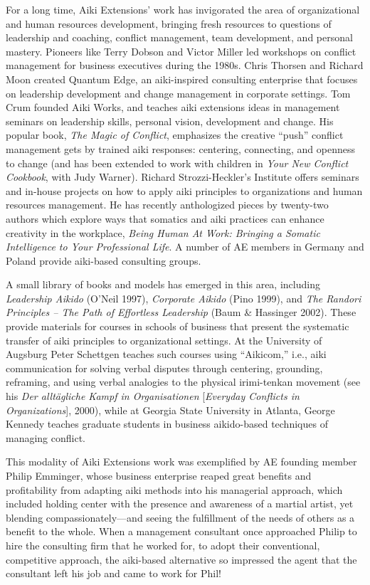 For a long time, Aiki Extensions' work has invigorated the area of organizational and human resources development, bringing fresh resources to questions of leadership and coaching, conflict management, team development, and personal mastery. Pioneers like Terry Dobson and Victor Miller led workshops on conflict management for business executives during the 1980s. Chris Thorsen and Richard Moon created Quantum Edge, an aiki-inspired consulting enterprise that focuses on leadership development and change management in corporate settings. Tom Crum founded Aiki Works, and teaches aiki extensions ideas in management seminars on leadership skills, personal vision, development and change. His popular book, \emph{The Magic of Conflict}, emphasizes the creative ``push'' conflict management gets by trained aiki responses: centering, connecting, and openness to change (and has been extended to work with children in \emph{Your New Conflict Cookbook}, with Judy Warner). Richard Strozzi-Heckler's Institute offers seminars and in-house projects on how to apply aiki principles to organizations and human resources management. He has recently anthologized pieces by twenty-two authors which explore ways that somatics and aiki practices can enhance creativity in the workplace, \emph{Being Human At Work: Bringing a Somatic Intelligence to Your Professional Life}. A number of AE members in Germany and Poland provide aiki-based consulting groups. 

A small library of books and models has emerged in this area, including \emph{Leadership Aikido} (O'Neil 1997), \emph{Corporate Aikido} (Pino 1999), and \emph{The Randori Principles -- The Path of Effortless Leadership} (Baum \& Hassinger 2002). These provide materials for courses in schools of business that present the systematic transfer of aiki principles to organizational settings. At the University of Augsburg Peter Schettgen teaches such courses using ``Aikicom,'' i.e., aiki communication for solving verbal disputes through centering, grounding, reframing, and using verbal analogies to the physical irimi-tenkan movement (see his \emph{Der allt\"{a}gliche Kampf in Organisationen} [\emph{Everyday Conflicts in Organizations}], 2000), while at Georgia State University in Atlanta, George Kennedy teaches graduate students in business aikido-based techniques of managing conflict. 

This modality of Aiki Extensions work was exemplified by AE founding member Philip Emminger, whose business enterprise reaped great benefits and profitability from adapting aiki methods into his managerial approach, which included holding center with the presence and awareness of a martial artist, yet blending compassionately---and seeing the fulfillment of the needs of others as a benefit to the whole. When a management consultant once approached Philip to hire the consulting firm that he worked for, to adopt their conventional, competitive approach, the aiki-based alternative so impressed the agent that the consultant left his job and came to work for Phil!

